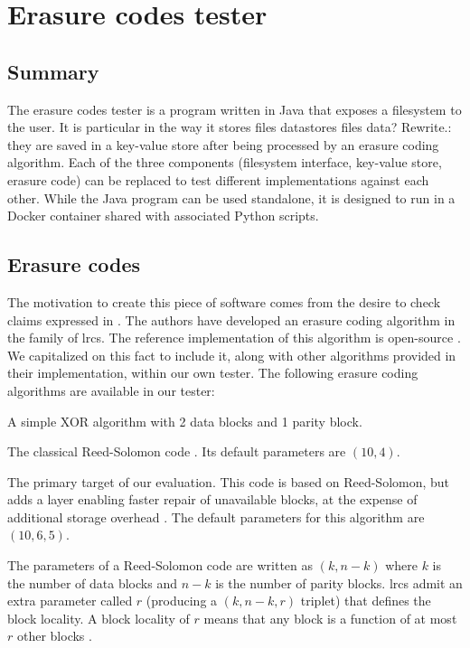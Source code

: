 \section{Erasure codes tester}

\subsection{Summary}

The erasure codes tester is a program written in Java that exposes a filesystem to the user.
It is particular in the way it stores files data{stores files data? Rewrite.}: they are saved in a key-value store after being processed by an erasure coding algorithm.
Each of the three components (filesystem interface, key-value store, erasure code) can be replaced to test different implementations against each other.
While the Java program can be used standalone, it is designed to run in a Docker container shared with associated Python scripts.

\subsection{Erasure codes}

The motivation to create this piece of software comes from the desire to check claims expressed in  \autocite{XorbasVLDB}.
The authors have developed an erasure coding algorithm in the family of \acfp{lrc}.
The reference implementation of this algorithm is open-source \autocite{xorbas-github}.
We capitalized on this fact to include it, along with other algorithms provided in their implementation, within our own tester.
The following erasure coding algorithms are available in our tester:
\begin{description}
\item[XOR] A simple XOR algorithm with 2 data blocks and 1 parity block.
\item[Reed-Solomon] The classical Reed-Solomon code \autocite{reed-solomon}. Its default parameters are $(10,4)$.
\item[\ac{lrc}] The primary target of our evaluation. This code is based on Reed-Solomon, but adds a layer enabling faster repair of unavailable blocks, at the expense of additional storage overhead \autocite{XorbasVLDB}. The default parameters for this algorithm are $(10,6,5)$. 
\end{description}
The parameters of a Reed-Solomon code are written as $(k,n-k)$ where $k$ is the number of data blocks and $n-k$ is the number of parity blocks.
\acp{lrc} admit an extra parameter called $r$ (producing a $(k,n-k,r)$ triplet) that defines the block locality.
A block locality of $r$ means that any block is a function of at most $r$ other blocks \autocite{XorbasVLDB}. 


